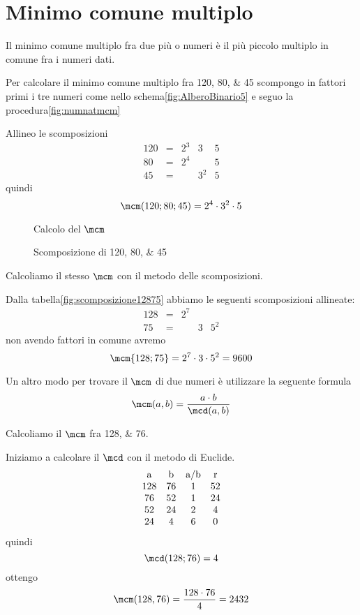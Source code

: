 \section{Minimo comune multiplo}
        	\label{sec:mcmnumerinaturali}
     Il minimo comune multiplo fra due più o numeri è il più piccolo multiplo  in comune fra i numeri dati. 
    
    Per calcolare il minimo comune multiplo fra \numlist{120;80;45}  scompongo in fattori  primi i tre numeri come nello schema\vref{fig:AlberoBinario5}   e seguo la procedura\nobs\vref{fig:numnatmcm}     	
    	
   Allineo le scomposizioni
    \[
       \begin{array}{rclll}
       120&= & 2^3 & 3& 5 \\
       80&= & 2^4 & & 5 \\
       45&= &  & 3^2& 5
       \end{array}
       \]
    quindi \[ \mcm(120;80;45)=2^4\cdot 3^2\cdot 5\]
    	    \begin{figure}
    	    	\centering
    	    
    	    	\caption{Calcolo del $\mcm$}
    	    \label{fig:numnatmcm}
    	    \end{figure}
    \begin{figure}
    	\centering
    
    	\caption[]{Scomposizione di \numlist{120;80;45}}  
    	\label{fig:AlberoBinario5}
    \end{figure}
  \begin{esempiot}{}{}
   Calcoliamo il stesso $\mcm$ con il metodo delle scomposizioni. 
   \end{esempiot}
     	    Dalla tabella\nobs\vref{fig:scomposizione12875} abbiamo le seguenti scomposizioni allineate:
     	     \[
     	       \begin{array}{rclll}
     	       128& = & 2^7&   &    \\
     	       75 & = &    & 3 & 5^2 
     	       \end{array}
     	       \]
     	            	       non avendo fattori in comune avremo
     	        \[\mcm{128;75}=2^7\cdot 3\cdot 5^2=9600\] 

  Un altro modo per trovare il $\mcm$ di due numeri è utilizzare la seguente formula\[ \mcm(a,b )=\dfrac{a\cdot b}{\mcd(a,b)}\]
  \begin{esempiot}{}{}
  Calcoliamo il $\mcm$ fra \numlist{128;76}. 
    \end{esempiot}
  Iniziamo a calcolare il $\mcd$ con il metodo di Euclide.
   \[
     	   \begin{array}{cccc}
     	   $a$&$b$&$a/b$&$r$\\
     	   	128 & 76 & 1 & 52\\
     	   	76 & 52 & 1 & 24\\
     	   	52 & 24 & 2 & 4\\
     	   	24 & 4 & 6 & 0
     	    \end{array} 
     	     \]
     	quindi \[\mcd(128;76)=4\]
     	ottengo
     	\[ \mcm(128,76 )=\dfrac{128\cdot 76}{4}=2432\]


